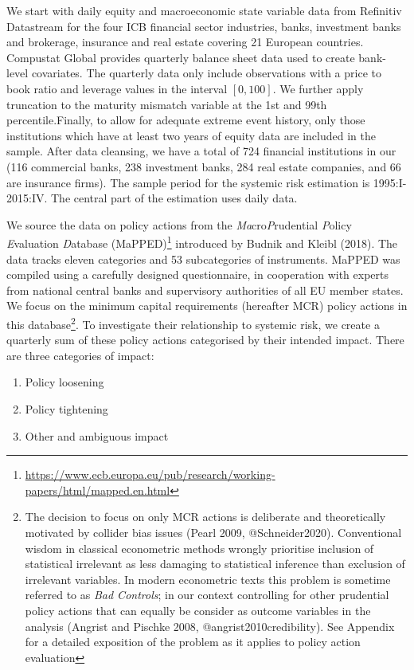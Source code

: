 \documentclass[
  10pt,
]{article}
\providecommand{\tightlist}{%
  \setlength{\itemsep}{0pt}\setlength{\parskip}{0pt}}
\begin{document}
We start with daily equity and macroeconomic state variable data from
Refinitiv Datastream for the four ICB financial sector industries,
banks, investment banks and brokerage, insurance and real estate
covering 21 European countries. Compustat Global provides quarterly
balance sheet data used to create bank-level covariates. The quarterly
data only include observations with a price to book ratio and leverage
values in the interval \([0, 100]\). We further apply truncation to the
maturity mismatch variable at the 1st and 99th percentile.Finally, to
allow for adequate extreme event history, only those institutions which
have at least two years of equity data are included in the sample. After
data cleansing, we have a total of 724 financial institutions in our
(116 commercial banks, 238 investment banks, 284 real estate companies,
and 66 are insurance firms). The sample period for the systemic risk
estimation is 1995:I-2015:IV. The central part of the estimation uses
daily data.

We source the data on policy actions from the
\emph{Ma}cro\emph{P}rudential \emph{P}olicy \emph{E}valuation
\emph{D}atabase (MaPPED)\footnote{\url{https://www.ecb.europa.eu/pub/research/working-papers/html/mapped.en.html}}
introduced by Budnik and Kleibl (2018). The data tracks eleven
categories and 53 subcategories of instruments. MaPPED was compiled
using a carefully designed questionnaire, in cooperation with experts
from national central banks and supervisory authorities of all EU member
states. We focus on the minimum capital requirements (hereafter MCR)
policy actions in this database\footnote{The decision to focus on only
  MCR actions is deliberate and theoretically motivated by collider bias
  issues (Pearl 2009, @Schneider2020). Conventional wisdom in classical
  econometric methods wrongly prioritise inclusion of statistical
  irrelevant as less damaging to statistical inference than exclusion of
  irrelevant variables. In modern econometric texts this problem is
  sometime referred to as \emph{Bad Controls}; in our context
  controlling for other prudential policy actions that can equally be
  consider as outcome variables in the analysis (Angrist and Pischke
  2008, @angrist2010credibility). See Appendix for a detailed exposition
  of the problem as it applies to policy action evaluation}. To
investigate their relationship to systemic risk, we create a quarterly
sum of these policy actions categorised by their intended impact. There
are three categories of impact:

\begin{enumerate}
\def\labelenumi{\arabic{enumi}.}
\tightlist
\item
  Policy loosening
\item
  Policy tightening
\item
  Other and ambiguous impact
\end{enumerate}
\end{document}
